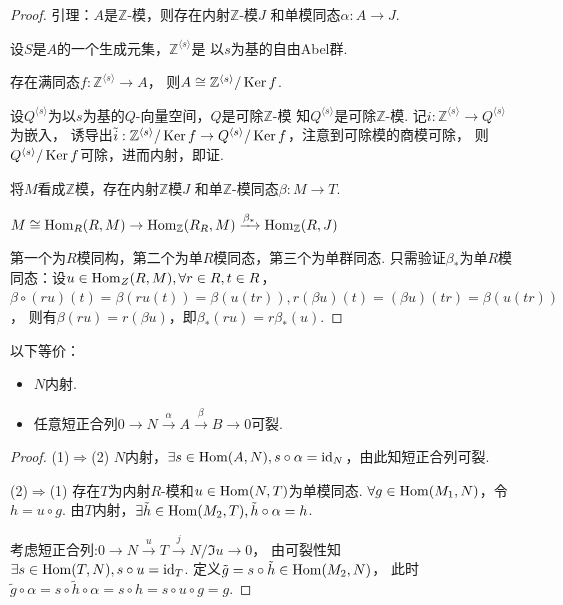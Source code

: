 \begin{proof}
引理：$ A $是$ \mathbb Z $-模，则存在内射$ \mathbb Z $-模$ J $
和单模同态$\alpha :A\rightarrow J$.

设$ S $是$ A $的一个生成元集，$\mathbb Z^{\langle s\rangle}$是
以$ s $为基的自由Abel群.

存在满同态$f:\mathbb Z^{\langle s\rangle}\rightarrow A $，
则$A\cong \mathbb Z^{\langle s\rangle}/\operatorname{Ker} f$.

设$Q^{\langle s\rangle}$为以$ s $为基的$ Q $-向量空间，$ Q $是可除$ \mathbb Z $-模
知$Q^{\langle s\rangle}$是可除$ \mathbb Z $-模.
记$i:\mathbb Z^{\langle s\rangle}\rightarrow Q^{\langle s\rangle}$为嵌入，
诱导出$\tilde i :\mathbb Z^{\langle s\rangle}/\operatorname{Ker} f
\rightarrow Q^{\langle s\rangle}/\operatorname{Ker} f$，注意到可除模的商模可除，
则$Q^{\langle s\rangle}/\operatorname{Ker} f$可除，进而内射，即证.

将$M$看成$\mathbb Z$模，存在内射$\mathbb Z$模$J$
和单$\mathbb Z$-模同态$\beta:M\rightarrow T$.

$M\cong \operatorname{Hom}_R(R,M)\rightarrow \operatorname{Hom}_{\mathbb Z}(R_R,M)
\xrightarrow{\beta_*}\operatorname{Hom}_{\mathbb Z}(R,J)$

第一个为$R$模同构，第二个为单$R$模同态，第三个为单群同态.
只需验证$\beta _*$为单$R$模同态：设$u\in \operatorname{Hom}_Z(R,M) ,\forall r\in R,t\in R$，
$\beta \circ(ru)(t)=\beta(ru(t))=\beta(u(tr)),
r(\beta u)(t)=(\beta u)(tr)=\beta(u(tr))$，
则有$\beta (ru)=r(\beta u)$，即$\beta_*(ru)=r\beta_*(u)$.
\end{proof}
    \begin{proposition}以下等价：
        \begin{itemize}
        \item[(1)] $N$内射.
        \item[(2)]任意短正合列$0\rightarrow N\xrightarrow{\alpha}A\xrightarrow{\beta}B\rightarrow0$可裂.
\end{itemize}
    \end{proposition}
\begin{proof}
(1)$\Rightarrow$(2) $N$内射，$\exists s\in \operatorname{Hom}(A,N),
s\circ \alpha=\operatorname{id}_N$，由此知短正合列可裂.

(2)$\Rightarrow$(1) 存在$T$为内射$R$-模和$u\in \operatorname{Hom}(N,T)$为单模同态.
$\forall g \in \operatorname{Hom}(M_1,N)$，令$h=u\circ g$.
由$T$内射，$\exists \tilde h \in \operatorname{Hom}(M_2,T),\tilde{h}\circ \alpha=h$.

考虑短正合列:$0\rightarrow N\xrightarrow{u}T\xrightarrow{j} N/\Im u \rightarrow 0$，
由可裂性知$\exists s\in \operatorname{Hom}(T,N),s\circ u =\operatorname{id}_T$.
定义$\tilde{g}=s\circ \tilde{h}\in \operatorname{Hom}(M_2,N)$，
此时$\tilde{g}\circ \alpha=s\circ\tilde{h}\circ \alpha
=s\circ h=s\circ u\circ g=g$.
\end{proof}
